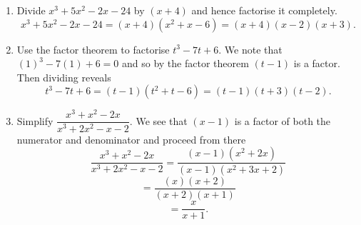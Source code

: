 \begin{enumerate}
\item
Divide $x^3 + 5x^2 -2x -24$ by $(x+4)$ and hence factorise it completely.
\[
x^3 + 5x^2 -2x - 24 = (x+4)(x^2+x -6) = (x+4)(x-2)(x+3).
\]
\item
Use the factor theorem to factorise $t^3 - 7t + 6$.
\newline
We note that $(1)^3 -7(1)+6 = 0$ and so by the factor theorem $(t-1)$ is a factor. Then dividing reveals
\[
t^3 - 7t + 6 = (t-1)(t^2+t -6) = (t-1)(t+3)(t-2).
\]
\item
Simplify $\dfrac{x^3+x^2-2x}{x^3+2x^2-x-2}$.
\newline
\newline
We see that $(x-1)$ is a factor of both the numerator and denominator and proceed from there
\[
\frac{x^3+x^2-2x}{x^3+2x^2-x-2} = \frac{\left(x-1\right)\left(x^2+2x\right)}{\left(x-1\right)\left(x^2+3x+2\right)}
\]
\[
= \frac{(x)(x+2)}{(x+2)(x+1)}
\]
\[
=\frac{x}{x+1}.
\]
\end{enumerate}